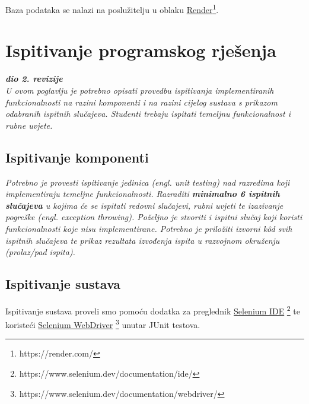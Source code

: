 			 Baza podataka se nalazi na poslužitelju u oblaku \underline{Render}\footnote{https://render.com/}.	
			
			\eject
		
	
			\section{Ispitivanje programskog rješenja}

			\textbf{\textit{dio 2. revizije}}\\
			
			\textit{U ovom poglavlju je potrebno opisati provedbu ispitivanja implementiranih funkcionalnosti na razini komponenti i na razini cijelog sustava s prikazom odabranih ispitnih slučajeva. Studenti trebaju ispitati temeljnu funkcionalnost i rubne uvjete.}
			
			\subsection{Ispitivanje komponenti}
			\textit{Potrebno je provesti ispitivanje jedinica (engl. unit testing) nad razredima koji implementiraju temeljne funkcionalnosti. Razraditi \textbf{minimalno 6 ispitnih slučajeva} u kojima će se ispitati redovni slučajevi, rubni uvjeti te izazivanje pogreške (engl. exception throwing). Poželjno je stvoriti i ispitni slučaj koji koristi funkcionalnosti koje nisu implementirane. Potrebno je priložiti izvorni kôd svih ispitnih slučajeva te prikaz rezultata izvođenja ispita u razvojnom okruženju (prolaz/pad ispita). }
			
			\subsection{Ispitivanje sustava}
			
			Ispitivanje sustava proveli smo pomoću dodatka za preglednik
			\underline{Selenium IDE} \footnote{https://www.selenium.dev/documentation/ide/}
			te koristeći \underline{Selenium WebDriver}
			\footnote{https://www.selenium.dev/documentation/webdriver/} unutar JUnit
			testova.
			
